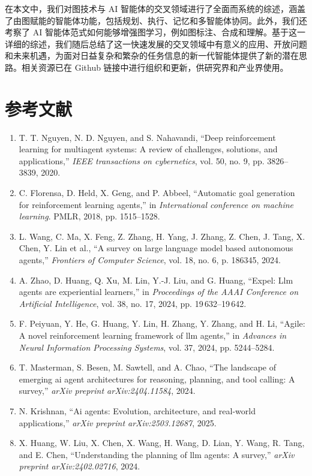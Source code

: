 \documentclass[10pt,UTF8,fontset=fandol]{ctexart}
\begin{document}
在本文中，我们对图技术与 AI 智能体的交叉领域进行了全面而系统的综述，涵盖了由图赋能的智能体功能，包括规划、执行、记忆和多智能体协同。此外，我们还考察了 AI 智能体范式如何能够增强图学习，例如图标注、合成和理解。基于这一详细的综述，我们随后总结了这一快速发展的交叉领域中有意义的应用、开放问题和未来机遇，为面对日益复杂和繁杂的任务信息的新一代智能体提供了新的潜在思路。相关资源已在 Github 链接中进行组织和更新，供研究界和产业界使用。

\section*{参考文献}
\begin{enumerate}[leftmargin=2.4em,labelsep=0.4em,itemsep=0.15em]
\item T. T. Nguyen, N. D. Nguyen, and S. Nahavandi, ``Deep reinforcement learning for multiagent systems: A review of challenges, solutions, and applications,'' \textit{IEEE transactions on cybernetics}, vol. 50, no. 9, pp. 3826--3839, 2020.
\item C. Florensa, D. Held, X. Geng, and P. Abbeel, ``Automatic goal generation for reinforcement learning agents,'' in \textit{International conference on machine learning}. PMLR, 2018, pp. 1515--1528.
\item L. Wang, C. Ma, X. Feng, Z. Zhang, H. Yang, J. Zhang, Z. Chen, J. Tang, X. Chen, Y. Lin et al., ``A survey on large language model based autonomous agents,'' \textit{Frontiers of Computer Science}, vol. 18, no. 6, p. 186345, 2024.
\item A. Zhao, D. Huang, Q. Xu, M. Lin, Y.-J. Liu, and G. Huang, ``Expel: Llm agents are experiential learners,'' in \textit{Proceedings of the AAAI Conference on Artificial Intelligence}, vol. 38, no. 17, 2024, pp. 19\,632--19\,642.
\item F. Peiyuan, Y. He, G. Huang, Y. Lin, H. Zhang, Y. Zhang, and H. Li, ``Agile: A novel reinforcement learning framework of llm agents,'' in \textit{Advances in Neural Information Processing Systems}, vol. 37, 2024, pp. 5244--5284.
\item T. Masterman, S. Besen, M. Sawtell, and A. Chao, ``The landscape of emerging ai agent architectures for reasoning, planning, and tool calling: A survey,'' \textit{arXiv preprint arXiv:2404.11584}, 2024.
\item N. Krishnan, ``Ai agents: Evolution, architecture, and real-world applications,'' \textit{arXiv preprint arXiv:2503.12687}, 2025.
\item X. Huang, W. Liu, X. Chen, X. Wang, H. Wang, D. Lian, Y. Wang, R. Tang, and E. Chen, ``Understanding the planning of llm agents: A survey,'' \textit{arXiv preprint arXiv:2402.02716}, 2024.

\end{enumerate}
\end{document}
